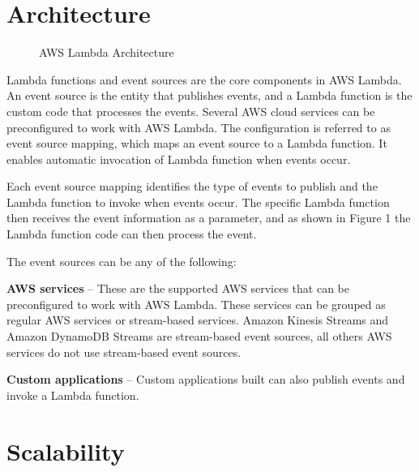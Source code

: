 \documentclass[9pt,twocolumn,twoside]{styles/osajnl}
\begin{document}
\section{Architecture}

\begin{figure}[h]
\centering
\graphicspath{ {images/} }
\caption{AWS Lambda Architecture} \cite{www-AWSLambda}
\label{fig:false-color}
\end{figure}

Lambda functions and event sources are the core components in AWS Lambda. An event source is the entity that publishes events, and a Lambda function is the custom code that processes the events. Several AWS cloud services can be preconfigured to work with AWS Lambda. The configuration is referred to as event source mapping, which maps an event source to a Lambda function. It enables automatic invocation of Lambda function when events occur.

Each event source mapping identifies the type of events to publish and the Lambda function to invoke when events occur. The specific Lambda function then receives the event information as a parameter, and as shown in Figure 1 the Lambda function code can then process the event.

The event sources can be any of the following:

\textbf{AWS services} – These are the supported AWS services that can be preconfigured to work with AWS Lambda. These services can be grouped as regular AWS services or stream-based services. Amazon Kinesis Streams \cite{www-AWSKinesis} and Amazon DynamoDB Streams \cite{www-AWSDynamoStream} are stream-based event sources, all others AWS services do not use stream-based event sources. 
 
\textbf{Custom applications} – Custom applications built can also publish events and invoke a Lambda function.

\section{Scalability}
\end{document}
